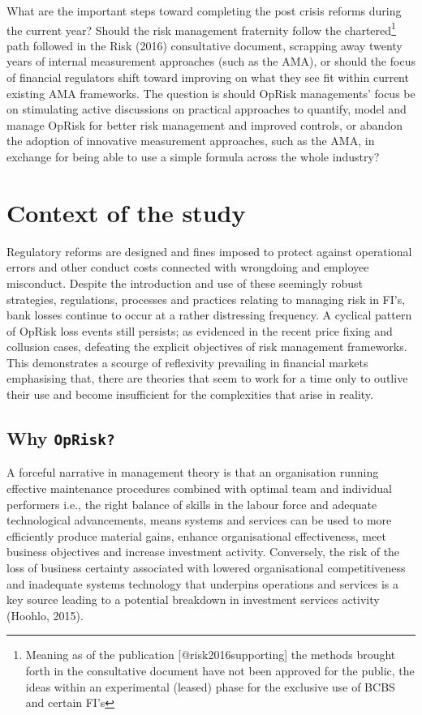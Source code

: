\documentclass{DissertateUSU}
\begin{document}
What are the important steps toward completing the post crisis reforms
during the current year? Should the risk management fraternity follow
the
chartered\footnote{Meaning as of the publication [@risk2016supporting] the methods brought forth in the consultative document have not been approved for the public, the ideas within an experimental (leased) phase for the exclusive use of BCBS and certain FI's}
path followed in the Risk (2016) consultative document, scrapping away
twenty years of internal measurement approaches (such as the AMA), or
should the focus of financial regulators shift toward improving on what
they see fit within current existing AMA frameworks. The question is
should OpRisk managements' focus be on stimulating active discussions on
practical approaches to quantify, model and manage OpRisk for better
risk management and improved controls, or abandon the adoption of
innovative measurement approaches, such as the AMA, in exchange for
being able to use a simple formula across the whole industry?

\section{Context of the study}
\label{sec:Context of the study}

Regulatory reforms are designed and fines imposed to protect against
operational errors and other conduct costs connected with wrongdoing and
employee misconduct. Despite the introduction and use of these seemingly
robust strategies, regulations, processes and practices relating to
managing risk in FI's, bank losses continue to occur at a rather
distressing frequency. A cyclical pattern of OpRisk loss events still
persists; as evidenced in the recent price fixing and collusion cases,
defeating the explicit objectives of risk management frameworks. This
demonstrates a scourge of reflexivity prevailing in financial markets
emphasising that, there are theories that seem to work for a time only
to outlive their use and become insufficient for the complexities that
arise in reality.

\subsection{Why \texttt{OpRisk?}}

A forceful narrative in management theory is that an organisation
running effective maintenance procedures combined with optimal team and
individual performers i.e., the right balance of skills in the labour
force and adequate technological advancements, means systems and
services can be used to more efficiently produce material gains, enhance
organisational effectiveness, meet business objectives and increase
investment activity. Conversely, the risk of the loss of business
certainty associated with lowered organisational competitiveness and
inadequate systems technology that underpins operations and services is
a key source leading to a potential breakdown in investment services
activity (Hoohlo, 2015).\medskip
\end{document}
